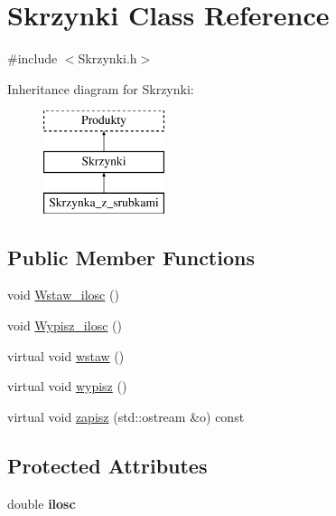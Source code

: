 \hypertarget{class_skrzynki}{}\section{Skrzynki Class Reference}
\label{class_skrzynki}


{\ttfamily \#include $<$Skrzynki.\+h$>$}

Inheritance diagram for Skrzynki\+:\begin{figure}[H]
\begin{center}
\leavevmode
\includegraphics[height=3.000000cm]{class_skrzynki}
\end{center}
\end{figure}
\subsection*{Public Member Functions}
\begin{DoxyCompactItemize}
\item 
void \mbox{\hyperlink{class_skrzynki_a15e7e3b171152bd8e8a0fe5a72fcd249}{Wstaw\+\_\+ilosc}} ()
\item 
void \mbox{\hyperlink{class_skrzynki_aeb630b847e07d0b66a1ba76ff8bec293}{Wypisz\+\_\+ilosc}} ()
\item 
virtual void \mbox{\hyperlink{class_skrzynki_a764d5064b25a294b3309dc5077a77921}{wstaw}} ()
\item 
virtual void \mbox{\hyperlink{class_skrzynki_adcf60a88ed78fba5a2dfdb54fa82b236}{wypisz}} ()
\item 
virtual void \mbox{\hyperlink{class_skrzynki_a2980647e51a17161872064efc5f1b185}{zapisz}} (std\+::ostream \&o) const
\end{DoxyCompactItemize}
\subsection*{Protected Attributes}
\begin{DoxyCompactItemize}
\item 
\mbox{\label{class_skrzynki_a93d76d16bac978c64614a03ccf621763}} 
double {\bfseries ilosc}
\end{DoxyCompactItemize}
